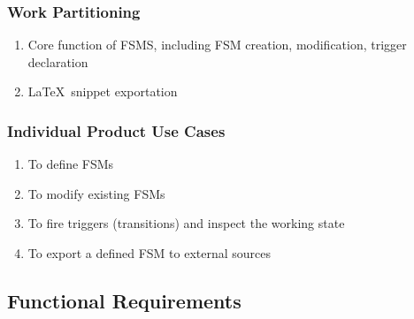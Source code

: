 \documentclass[12pt, titlepage]{article}
\begin{document}
\subsubsection{Work Partitioning}

\begin{enumerate}[{Partition} 1:]
\item Core function of FSMS, including FSM creation, modification, trigger
  declaration
\item \LaTeX\ snippet exportation
\end{enumerate}

\subsubsection{Individual Product Use Cases}

\begin{enumerate}[{UC}1.]
\item To define FSMs
\item To modify existing FSMs
\item To fire triggers (transitions) and inspect the working state
\item To export a defined FSM to external sources
\end{enumerate}

\subsection{Functional Requirements}
\end{document}
